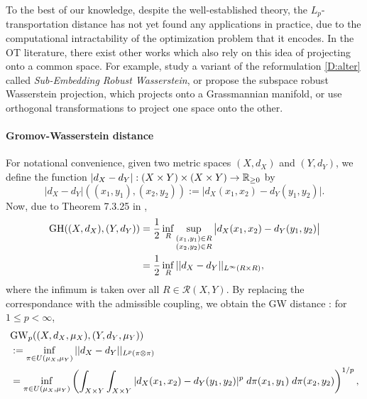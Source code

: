 To the best of our knowledge, despite the well-established theory,
the $L_p$-transportation distance has not yet found any applications in practice,
due to the computational intractability of the optimization problem that it encodes.
In the OT literature, there exist other works which also rely on
this idea of projecting onto a common space.
For example, \citep{Alaya22} study a variant of the reformulation \eqref{D:alter} called
\textit{Sub-Embedding Robust Wasserstein}, or
\citep{Paty19} propose the subspace robust Wasserstein projection,
which projects onto a Grassmannian manifold, or \citep{Cai22} use orthogonal transformations
to project one space onto the other.

\paragraph{Gromov-Wasserstein distance}
For notational convenience, given two metric spaces $(X, d_X)$ and $(Y, d_Y)$,
we define the function $|d_X - d_Y|: (X \times Y) \times (X \times Y) \to \mathbb R_{\geq 0}$ by
\begin{equation*}
    |d_X - d_Y|((x_1, y_1), (x_2, y_2)) := \big\vert d_X(x_1, x_2) - d_Y(y_1, y_2) \big\vert.
\end{equation*}
Now, due to Theorem 7.3.25 in \citep{Burago01},
\begin{equation}
  \begin{split}
    \text{GH}((X,d_X), (Y,d_Y)) &= \frac{1}{2} \inf_{R}
    \sup_{\substack{(x_1,y_1) \in R \\ (x_2,y_2) \in R}} \big| d_X(x_1, x_2) - d_Y(y_1, y_2) \big| \\
    &= \frac{1}{2} \inf_{R} || d_X - d_Y ||_{L^{\infty}(R \times R)},
  \end{split}
\end{equation}
where the infimum is taken over all $R \in \mathcal R(X,Y)$. By replacing the correspondance
with the admissible coupling, we obtain the GW distance \citep{Memoli07,Memoli11}:
for $1 \leq p < \infty$,
\begin{equation}
  \begin{split}
    &\text{GW}_p((X, d_X, \mu_X), (Y, d_Y, \mu_Y)) \\
    &:= \inf_{ \pi \in U(\mu_X, \mu_Y)} || d_X - d_Y ||_{L^p(\pi \otimes \pi)} \\
    &= \inf_{ \pi \in U(\mu_X, \mu_Y)}
    \left( \int_{X \times Y} \int_{X \times Y} |d_X(x_1, x_2) - d_Y(y_1, y_2)|^p \;
    d\pi(x_1, y_1) \; d\pi(x_2, y_2) \right)^{1 / p},
  \end{split}
\end{equation}
